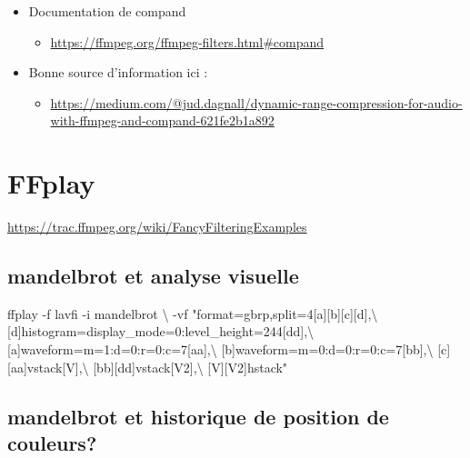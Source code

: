\documentclass[
  french,
]{book}
\newenvironment{Shaded}{\begin{snugshade}}{\end{snugshade}}
\newcommand{\AttributeTok}[1]{\textcolor[rgb]{0.77,0.63,0.00}{#1}}
\newcommand{\DataTypeTok}[1]{\textcolor[rgb]{0.13,0.29,0.53}{#1}}
\newcommand{\ExtensionTok}[1]{#1}
\newcommand{\NormalTok}[1]{#1}
\newcommand{\StringTok}[1]{\textcolor[rgb]{0.31,0.60,0.02}{#1}}
\providecommand{\tightlist}{%
  \setlength{\itemsep}{0pt}\setlength{\parskip}{0pt}}
\begin{document}
\begin{itemize}
\tightlist
\item
  Documentation de compand

  \begin{itemize}
  \tightlist
  \item
    \url{https://ffmpeg.org/ffmpeg-filters.html\#compand}
  \end{itemize}
\item
  Bonne source d'information ici :

  \begin{itemize}
  \tightlist
  \item
    \url{https://medium.com/@jud.dagnall/dynamic-range-compression-for-audio-with-ffmpeg-and-compand-621fe2b1a892}
  \end{itemize}
\end{itemize}

\hypertarget{ffplay}{%
\section{FFplay}\label{ffplay}}

\url{https://trac.ffmpeg.org/wiki/FancyFilteringExamples}

\hypertarget{mandelbrot-et-analyse-visuelle}{%
\subsection{mandelbrot et analyse visuelle}\label{mandelbrot-et-analyse-visuelle}}

\begin{Shaded}
\begin{Highlighting}[]
\ExtensionTok{ffplay} \AttributeTok{{-}f}\NormalTok{ lavfi }\AttributeTok{{-}i}\NormalTok{ mandelbrot }\DataTypeTok{\textbackslash{}}
\NormalTok{{-}vf }\StringTok{"format=gbrp,split=4[a][b][c][d],}\DataTypeTok{\textbackslash{}}
\StringTok{[d]histogram=display\_mode=0:level\_height=244[dd],}\DataTypeTok{\textbackslash{}}
\StringTok{[a]waveform=m=1:d=0:r=0:c=7[aa],}\DataTypeTok{\textbackslash{}}
\StringTok{[b]waveform=m=0:d=0:r=0:c=7[bb],}\DataTypeTok{\textbackslash{}}
\StringTok{[c][aa]vstack[V],}\DataTypeTok{\textbackslash{}}
\StringTok{[bb][dd]vstack[V2],}\DataTypeTok{\textbackslash{}}
\StringTok{[V][V2]hstack"}
\end{Highlighting}
\end{Shaded}

\hypertarget{mandelbrot-et-historique-de-position-de-couleurs}{%
\subsection{mandelbrot et historique de position de couleurs?}\label{mandelbrot-et-historique-de-position-de-couleurs}}
\end{document}
